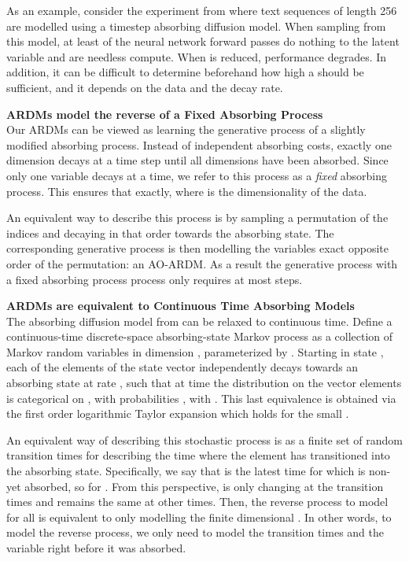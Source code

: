 \documentclass{article} \usepackage{iclr2022_conference,times}
\begin{document}
As an example, consider the experiment from \citep{austin2021structured} where text sequences of length 256 are modelled using a  timestep absorbing diffusion model. When sampling from this model, at least  of the neural network forward passes do nothing to the latent variable and are needless compute. When  is reduced, performance degrades. In addition, it can be difficult to determine beforehand how high a  should be sufficient, and it depends on the data and the decay rate. 


\textbf{ARDMs model the reverse of a Fixed Absorbing Process} \\
Our ARDMs can be viewed as learning the generative process of a slightly modified absorbing process. Instead of independent absorbing costs, exactly one dimension decays at a time step until all dimensions have been absorbed. Since only one variable decays at a time, we refer to this process as a \textit{fixed} absorbing process. This ensures that  exactly, where  is the dimensionality of the data.

An equivalent way to describe this process is by sampling a permutation of the indices  and decaying in that order towards the absorbing state. The corresponding generative process is then modelling the variables exact opposite order of the permutation: an AO-ARDM. As a result the generative process with a fixed absorbing process process only requires at most  steps.


 
\textbf{ARDMs are equivalent to Continuous Time Absorbing Models} \\
The absorbing diffusion model from \citep{austin2021structured} can be relaxed to continuous time. Define a continuous-time discrete-space absorbing-state Markov process as a collection of Markov random variables  in dimension , parameterized by . Starting in state , each of the elements  of the state vector independently decays towards an absorbing state  at rate , such that at time  the distribution on the vector elements is categorical on , with probabilities , with . This last equivalence is obtained via the first order logarithmic Taylor expansion  which holds for the small .


An equivalent way of describing this stochastic process is as a finite set of  random transition times  for  describing the time where the element  has transitioned into the absorbing state. Specifically, we say that  is the latest time for which  is non-yet absorbed, so  for . From this perspective,  is only changing at the transition times  and remains the same at other times. Then, the reverse process to model  for all  is equivalent to only modelling the finite dimensional . In other words, to model the reverse process, we only need to model the transition times  and the variable right before it was absorbed.
\end{document}
